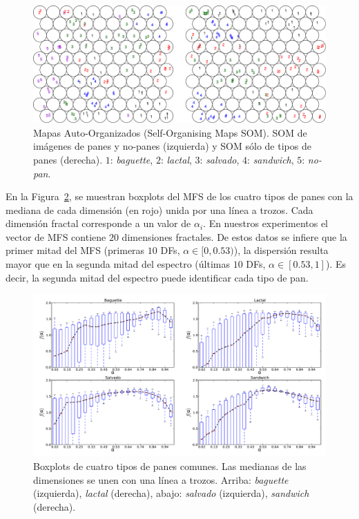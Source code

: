 \begin{figure}[h!]
\begin{centering}
\includegraphics[width=13cm]{figures/SOM}
\caption[Mapas Auto-Organizados de imágenes de panes y otros objetos]{Mapas Auto-Organizados (Self-Organising Maps SOM). SOM de imágenes de panes y no-panes (izquierda) y SOM sólo de tipos de panes (derecha). $1$: {\em baguette}, $2$: {\em lactal}, $3$: {\em salvado}, $4$: {\em sandwich}, $5$: {\em no-pan}.}
\label{fig:somfractal}
\end{centering}
\end{figure}

En la Figura~\ref{fig:boxplotsMFS}, se muestran boxplots del MFS de los cuatro tipos de panes con la mediana de cada dimensión (en rojo) unida por una línea a trozos.
Cada dimensión fractal corresponde a un valor de $\alpha_{i}$.
En nuestros experimentos el vector de MFS contiene $20$ dimensiones fractales. De estos datos se infiere que la primer mitad del MFS (primeras $10$ DFs, $\alpha \in [0,0.53)$), la dispersión resulta mayor que en la segunda mitad del espectro  (últimas $10$ DFs, $\alpha \in [0.53,1]$).
Es decir, la segunda mitad del espectro puede identificar cada tipo de pan.


\begin{figure}[h!]
\centering
\includegraphics[width=13cm]{figures/boxplots}
\caption[Boxplots de distintos tipos de panes]{Boxplots de cuatro tipos de panes comunes. Las medianas de las dimensiones se unen con una línea a trozos. Arriba: {\em baguette} (izquierda), {\em lactal} (derecha), abajo: {\em salvado} (izquierda), {\em sandwich} (derecha).}
\label{fig:boxplotsMFS}
\end{figure}


